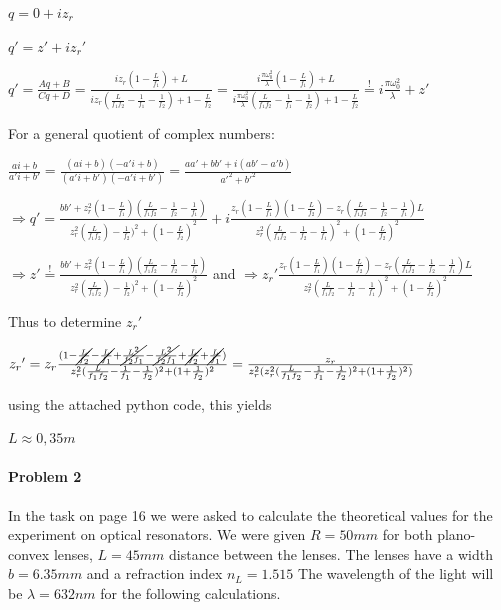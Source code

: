 \documentclass{article}
\newcommand{\mbeq}{\overset{!}{=}}
\begin{document}
\setlength{\parskip}{2em}

$
q=0+iz_r$\par$
{q}'={z}'+i{z_r}'
$

${q}'=\frac{Aq+B}{Cq+D}=\frac{iz_r(1-\frac{L}{f_1})+L}{iz_r(\frac{L}{f_1 f_2}-\frac{1}{f_1}-\frac{1}{f_2})+1-\frac{L}{f_2}}=\frac{i\frac{\pi\omega_0^2}{\lambda}(1-\frac{L}{f_1})+L}{i\frac{\pi\omega_0^2}{\lambda}(\frac{L}{f_1 f_2}-\frac{1}{f_1}-\frac{1}{f_2})+1-\frac{L}{f_2}}\mbeq i\frac{\pi\omega_0^2}{\lambda}+{z}'$ 


For a general quotient of complex numbers:

$\frac{ai+b}{{a}'i+{b}'}=\frac{(ai+b)(-{a}'i+b)}{({a}'i+{b}')(-{a}'i+{b}')}=\frac{a{a}'+b{b}'+i(a{b}'-{a}'b)}{{a}'^2+{b}'^2}
$

$\Rightarrow{} {q}' = \frac{b{b}'+z_r^2(1-\frac{L}{f_1})(\frac{L}{f_1 f_2}-\frac{1}{f_2}-\frac{1}{f_1})}{z_r^2(\frac{L}{f_1 f_2})-\frac{1}{f_2})^2+(1-\frac{L}{f_2})^2}+i\frac{z_r(1-\frac{L}{f_1})(1-\frac{L}{f_2})-z_r(\frac{L}{f_1 f_2}-\frac{1}{f_2}-\frac{1}{f_1})L}{z_r^2(\frac{L}{f_1 f_2}-\frac{1}{f_2}-\frac{1}{f_1})^2+(1-\frac{L}{f_2})^2}
$

$\Rightarrow{} {z}'\mbeq \frac{b{b}'+z_r^2(1-\frac{L}{f_1})(\frac{L}{f_1 f_2}-\frac{1}{f_2}-\frac{1}{f_1})}{z_r^2(\frac{L}{f_1 f_2})-\frac{1}{f_2})^2+(1-\frac{L}{f_2})^2} $
 and
 $\Rightarrow{}{} {z_r}' \frac{z_r(1-\frac{L}{f_1})(1-\frac{L}{f_2})-z_r(\frac{L}{f_1 f_2}-\frac{1}{f_2}-\frac{1}{f_1})L}{z_r^2(\frac{L}{f_1 f_2}-\frac{1}{f_2}-\frac{1}{f_1})^2+(1-\frac{L}{f_2})^2}$
 
 Thus to determine ${z_r}'$
 
 ${z_r}'=z_r\frac{(1-\cancel{\frac{L}{f_2}}-\cancel{\frac{L}{f_1}}+\cancel{\frac{L^2}{f_2 f_1}}-\cancel{\frac{L^2}{f_2 f_1}}+\cancel{\frac{L}{f_2}}+\cancel{\frac{L}{f_1}})}{z_r^2(\frac{L}{f_1 f_2}-\frac{1}{f_1}-\frac{1}{f_2})^2+(1+\frac{1}{f_2})^2}=\frac{z_r}{z_r^2(z_r^2(\frac{L}{f_1 f_2}-\frac{1}{f_1}-\frac{1}{f_2})^2+(1+\frac{1}{f_2})^2)} 
 $
 
 using the attached python code, this yields
 
 $L \approx 0,35 m$


\paragraph{Problem 2}

 In the task on page 16 we were asked to calculate the theoretical values for the experiment on optical resonators. We were given $R=50mm$ for both plano-convex lenses, $L=45mm$ distance between the lenses. The lenses have a width $b=6.35mm$ and a refraction index $n_{L} = 1.515$ The wavelength of the light will be $\lambda = 632nm$ for the following calculations.\\
\\
\end{document}
